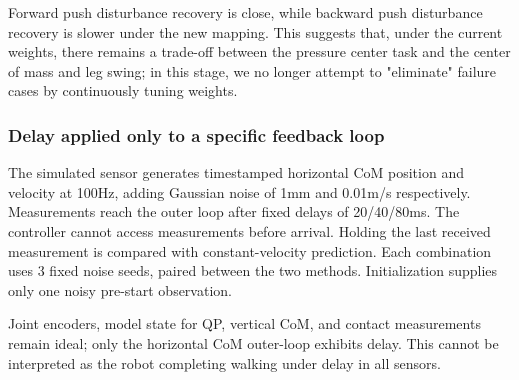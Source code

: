 
Forward push disturbance recovery is close, while backward push disturbance recovery is slower under the new mapping. This suggests that, under the current weights, there remains a trade-off between the pressure center task and the center of mass and leg swing; in this stage, we no longer attempt to "eliminate" failure cases by continuously tuning weights.

\subsubsection{Delay applied only to a specific feedback loop}\label{s24-detail-3}

The simulated sensor generates timestamped horizontal CoM position and velocity at 100Hz, adding Gaussian noise of 1mm and 0.01m/s respectively. Measurements reach the outer loop after fixed delays of 20/40/80ms. The controller cannot access measurements before arrival. Holding the last received measurement is compared with constant-velocity prediction. Each combination uses 3 fixed noise seeds, paired between the two methods. Initialization supplies only one noisy pre-start observation.

Joint encoders, model state for QP, vertical CoM, and contact measurements remain ideal; only the horizontal CoM outer-loop exhibits delay. This cannot be interpreted as the robot completing walking under delay in all sensors.

